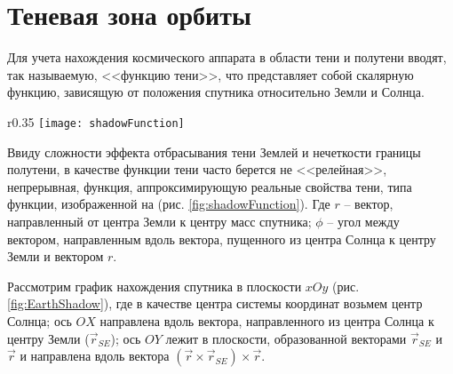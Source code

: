 \section{Теневая зона орбиты}
\noindent\indent Для учета нахождения космического аппарата в области тени и
полутени вводят, так называемую, <<функцию тени>>, что представляет собой
скалярную функцию, зависящую от положения спутника относительно Земли и Солнца.
\begin{wrapfigure}{r}{0.35\textwidth}
  \centering
  \texttt{[image: shadowFunction]}
  \caption{Функция тени}
  \label{fig:shadowFunction}
\end{wrapfigure}
Ввиду сложности эффекта отбрасывания тени Землей и нечеткости границы полутени,
в качестве функции тени часто берется не <<релейная>>, непрерывная, функция,
аппроксимирующую реальные свойства тени, типа функции, изображенной на
(рис. \ref{fig:shadowFunction}).
Где $r$ -- вектор, направленный от центра Земли к центру масс спутника; $\phi$
-- угол между вектором, направленным вдоль вектора, пущенного из центра Солнца к
центру Земли и вектором $r$.\par
Рассмотрим график нахождения спутника в плоскости $xOy$ (рис. \ref{fig:EarthShadow}),
где в качестве центра системы координат возьмем центр Солнца; ось $OX$ направлена
вдоль вектора, направленного из центра Солнца к центру Земли ($\vec{r}_{SE}$);
ось $OY$ лежит в плоскости, образованной векторами $\vec{r}_{SE}$ и $\vec{r}$ и направлена
вдоль вектора $(\vec{r}\times\vec{r}_{SE})\times\vec{r}$.
